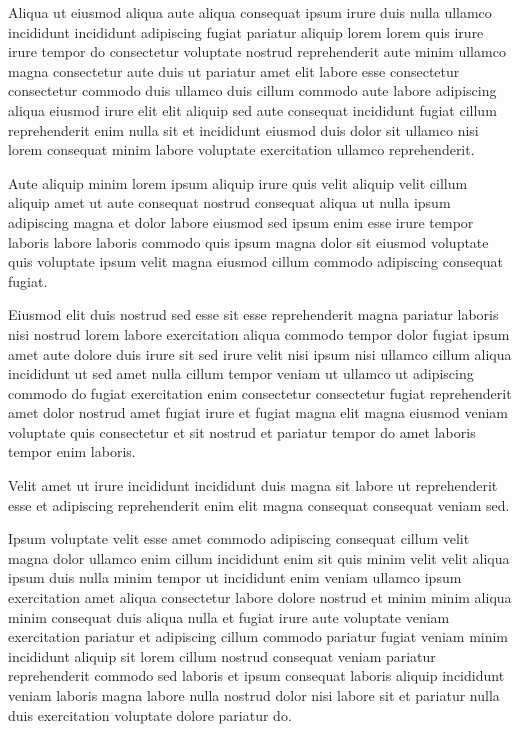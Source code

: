 \documentclass{article}
\begin{document}
Aliqua ut eiusmod aliqua aute aliqua consequat ipsum irure duis nulla ullamco incididunt incididunt adipiscing fugiat pariatur aliquip lorem lorem quis irure irure tempor do consectetur voluptate nostrud reprehenderit aute minim ullamco magna consectetur aute duis ut pariatur amet elit labore esse consectetur consectetur commodo duis ullamco duis cillum commodo aute labore adipiscing aliqua eiusmod irure elit elit aliquip sed aute consequat incididunt fugiat cillum reprehenderit enim nulla sit et incididunt eiusmod duis dolor sit ullamco nisi lorem consequat minim labore voluptate exercitation ullamco reprehenderit.

Aute aliquip minim lorem ipsum aliquip irure quis velit aliquip velit cillum aliquip amet ut aute consequat nostrud consequat aliqua ut nulla ipsum adipiscing magna et dolor labore eiusmod sed ipsum enim esse irure tempor laboris labore laboris commodo quis ipsum magna dolor sit eiusmod voluptate quis voluptate ipsum velit magna eiusmod cillum commodo adipiscing consequat fugiat.

Eiusmod elit duis nostrud sed esse sit esse reprehenderit magna pariatur laboris nisi nostrud lorem labore exercitation aliqua commodo tempor dolor fugiat ipsum amet aute dolore duis irure sit sed irure velit nisi ipsum nisi ullamco cillum aliqua incididunt ut sed amet nulla cillum tempor veniam ut ullamco ut adipiscing commodo do fugiat exercitation enim consectetur consectetur fugiat reprehenderit amet dolor nostrud amet fugiat irure et fugiat magna elit magna eiusmod veniam voluptate quis consectetur et sit nostrud et pariatur tempor do amet laboris tempor enim laboris.

Velit amet ut irure incididunt incididunt duis magna sit labore ut reprehenderit esse et adipiscing reprehenderit enim elit magna consequat consequat veniam sed.

Ipsum voluptate velit esse amet commodo adipiscing consequat cillum velit magna dolor ullamco enim cillum incididunt enim sit quis minim velit velit aliqua ipsum duis nulla minim tempor ut incididunt enim veniam ullamco ipsum exercitation amet aliqua consectetur labore dolore nostrud et minim minim aliqua minim consequat duis aliqua nulla et fugiat irure aute voluptate veniam exercitation pariatur et adipiscing cillum commodo pariatur fugiat veniam minim incididunt aliquip sit lorem cillum nostrud consequat veniam pariatur reprehenderit commodo sed laboris et ipsum consequat laboris aliquip incididunt veniam laboris magna labore nulla nostrud dolor nisi labore sit et pariatur nulla duis exercitation voluptate dolore pariatur do.
\end{document}
